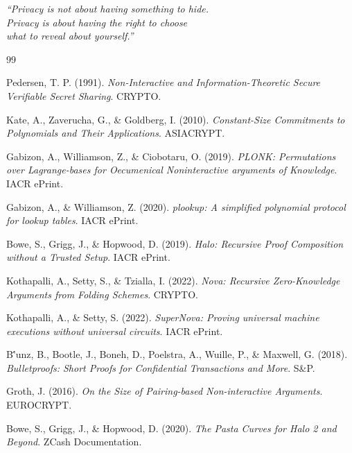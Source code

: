 \documentclass[11pt,a4paper,twoside]{book}
\begin{document}
\begin{center}
\textit{``Privacy is not about having something to hide.}\\
\textit{Privacy is about having the right to choose}\\
\textit{what to reveal about yourself.''}
\end{center}

\cleardoublepage

\backmatter

\begin{thebibliography}{99}

 Pedersen, T. P. (1991). \textit{Non-Interactive and Information-Theoretic Secure Verifiable Secret Sharing}. CRYPTO.

 Kate, A., Zaverucha, G., \& Goldberg, I. (2010). \textit{Constant-Size Commitments to Polynomials and Their Applications}. ASIACRYPT.

 Gabizon, A., Williamson, Z., \& Ciobotaru, O. (2019). \textit{PLONK: Permutations over Lagrange-bases for Oecumenical Noninteractive arguments of Knowledge}. IACR ePrint.

 Gabizon, A., \& Williamson, Z. (2020). \textit{plookup: A simplified polynomial protocol for lookup tables}. IACR ePrint.

 Bowe, S., Grigg, J., \& Hopwood, D. (2019). \textit{Halo: Recursive Proof Composition without a Trusted Setup}. IACR ePrint.

 Kothapalli, A., Setty, S., \& Tzialla, I. (2022). \textit{Nova: Recursive Zero-Knowledge Arguments from Folding Schemes}. CRYPTO.

 Kothapalli, A., \& Setty, S. (2022). \textit{SuperNova: Proving universal machine executions without universal circuits}. IACR ePrint.

 B\''unz, B., Bootle, J., Boneh, D., Poelstra, A., Wuille, P., \& Maxwell, G. (2018). \textit{Bulletproofs: Short Proofs for Confidential Transactions and More}. S\&P.

 Groth, J. (2016). \textit{On the Size of Pairing-based Non-interactive Arguments}. EUROCRYPT.

 Bowe, S., Grigg, J., \& Hopwood, D. (2020). \textit{The Pasta Curves for Halo 2 and Beyond}. ZCash Documentation.


\end{thebibliography}
\end{document}

